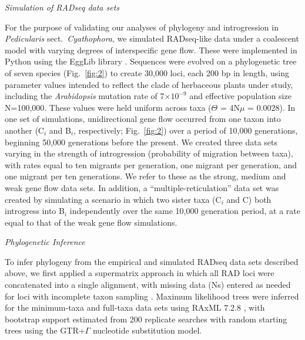 \documentclass[12pt,letterpaper]{article}
\renewcommand{\subsection}[1]{%
\bigskip
\begin{center}
\begin{large}
\normalfont\itshape #1
\end{large}
\end{center}}
\providecommand{\e}[1]{\ensuremath{\times 10^{#1}}}
\begin{document}
\subsection{Simulation of RADseq data sets}
For the purpose of validating our analyses of phylogeny and
introgression in \emph{Pedicularis} sect.\ \emph{Cyathophora}, we
simulated RADseq-like data under a coalescent model with varying
degrees of interspecific gene flow. These were implemented in Python
using the EggLib library \citep{mita_egglib:_2012}. Sequences were
evolved on a phylogenetic tree of seven species (Fig.~\ref{fig:2}) to
create 30,000 loci, each 200 bp in length, using parameter values
intended to reflect the clade of herbaceous plants under study, 
including the \emph{Arabidopsis} mutation rate of 7\e{-9} 
\citep{ossowski_rate_2010} and effective population size 
N=100,000.
These values were held uniform across taxa ($\Theta$ = 4N$\mu$ =
0.0028). In one set of simulations, unidirectional gene flow occurred
from one taxon into another (C$_i$ and B$_i$, respectively;
Fig.~\ref{fig:2}) over a period of 10,000 generations, beginning
50,000 generations before the present. We created three data sets
varying in the strength of introgression (probability of migration
between taxa), with rates equal to ten migrants per generation, one
migrant per generation, and one migrant per ten generations. We refer
to these as the strong, medium and weak gene flow data sets.  In
addition, a ``multiple-reticulation'' data set was created by
simulating a scenario in which two sister taxa (C$_i$ and C) both
introgress into B$_i$ independently over the same 10,000 generation
period, at a rate equal to that of the weak gene flow
simulations. 


\subsection{Phylogenetic Inference}
To infer phylogeny from the empirical and simulated RADseq data sets
described above, we first applied a supermatrix approach in which all
RAD loci were concatenated into a single alignment, with missing data
(Ns) entered as needed for loci with incomplete taxon sampling
\citep{dequeiroz_supermatrix_2007}. Maximum likelihood trees were
inferred for the minimum-taxa and full-taxa data sets using RAxML
7.2.8 \citep{stamatakis_raxml-vi-hpc:_2006}, with bootstrap support
estimated from 200 replicate searches with random starting trees using
the GTR+$\Gamma$ nucleotide substitution model.
\end{document}
